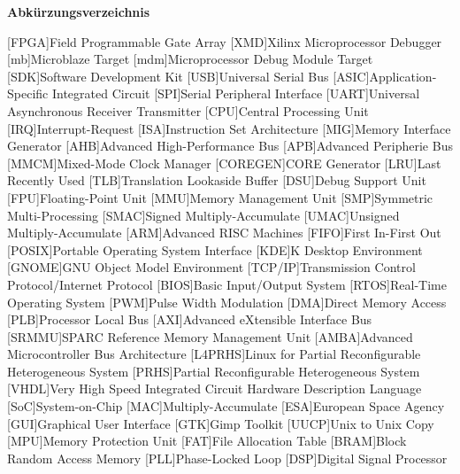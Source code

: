 
{\textbf{Abkürzungsverzeichnis}}

\begin{acronym}[Bash]
 [FPGA]{Field Programmable Gate Array}
 [XMD]{Xilinx Microprocessor Debugger}
 [mb]{Microblaze Target}
 [mdm]{Microprocessor Debug Module Target}
 [SDK]{Software Development Kit}
 [USB]{Universal Serial Bus}
 [ASIC]{Application-Specific Integrated Circuit}
 [SPI]{Serial Peripheral Interface}
 [UART]{Universal Asynchronous Receiver Transmitter}
 [CPU]{Central Processing Unit}
 [IRQ]{Interrupt-Request}
 [ISA]{Instruction Set Architecture}
 [MIG]{Memory Interface Generator}
 [AHB]{Advanced High-Performance Bus}
  [APB]{Advanced Peripherie Bus}
 [MMCM]{Mixed-Mode Clock Manager}
 [COREGEN]{CORE Generator}
  [LRU]{Last Recently Used}
  [TLB]{Translation Lookaside Buffer}
  [DSU]{Debug Support Unit}
  [FPU]{Floating-Point Unit}
 [MMU]{Memory Management Unit}
  [SMP]{Symmetric Multi-Processing}
 [SMAC]{Signed Multiply-Accumulate}
  [UMAC]{Unsigned Multiply-Accumulate}
 [ARM]{Advanced RISC Machines}
 [FIFO]{First In-First Out}
 [POSIX]{Portable Operating System Interface}
 [KDE]{K Desktop Environment}
 [GNOME]{GNU Object Model Environment}
  [TCP/IP]{Transmission Control Protocol/Internet Protocol}
[BIOS]{Basic Input/Output System}
 [RTOS]{Real-Time Operating System}
 [PWM]{Pulse Width Modulation}
  [DMA]{Direct Memory Access}
 [PLB]{Processor Local Bus}
 [AXI]{Advanced eXtensible Interface Bus}
[SRMMU]{SPARC Reference Memory Management Unit}
 [AMBA]{Advanced Microcontroller Bus Architecture}
  [L4PRHS]{Linux for Partial Reconfigurable Heterogeneous System}
   [PRHS]{Partial Reconfigurable Heterogeneous System}
[VHDL]{Very High Speed Integrated Circuit Hardware Description Language}
[SoC]{System-on-Chip}
[MAC]{Multiply-Accumulate}
 [ESA]{European Space Agency}
 [GUI]{Graphical User Interface}
 [GTK]{Gimp Toolkit}
 [UUCP]{Unix to Unix Copy}
 [MPU]{Memory Protection Unit}
[FAT]{File Allocation Table}
  [BRAM]{Block Random Access Memory}
  [PLL]{Phase-Locked Loop}
  [DSP]{Digital Signal Processor}

\end{acronym}
